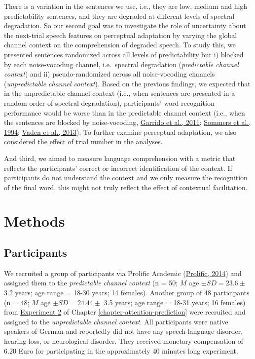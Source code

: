 \documentclass[a4paper, nobind]{templates/ociamthesis}
\begin{document}
There is a variation in the sentences we use, i.e., they are low, medium and high predictability sentences, and they are degraded at different levels of spectral degradation.
So our second goal was to investigate the role of uncertainty about the next-trial speech features on perceptual adaptation by varying the global channel context on the comprehension of degraded speech.
To study this, we presented sentences randomized across all levels of predictability but
i) blocked by each noise-vocoding channel, i.e.~spectral degradation (\emph{predictable channel context}) and
ii) pseudo-randomized across all noise-vocoding channels (\emph{unpredictable channel context}).
Based on the previous findings, we expected that in the unpredictable channel context (i.e., when sentences are presented in a random order of spectral degradation), participants' word recognition performance would be worse than in the predictable channel context (i.e., when the sentences are blocked by noise-vocoding, \protect\hyperlink{ref-Garrido2011}{Garrido et al., 2011}; \protect\hyperlink{ref-Sommers1994}{Sommers et al., 1994}; \protect\hyperlink{ref-Vaden2013}{Vaden et al., 2013}).
To further examine perceptual adaptation, we also considered the effect of trial number in the analyses.

And third, we aimed to measure language comprehension with a metric that reflects the participants' correct or incorrect identification of the context.
If participants do not understand the context and we only measure the recognition of the final word, this might not truly reflect the effect of contextual facilitation.

\hypertarget{methods-2}{%
\section{Methods}\label{methods-2}}

\hypertarget{participants-1}{%
\subsection{Participants}\label{participants-1}}

We recruited a group of participants via Prolific Academic (\protect\hyperlink{ref-Prolific}{Prolific, 2014}) and assigned them to the \emph{predictable channel context} (n = 50; \(M\) age \(\pm SD=23.6\pm\) 3.2 years; age range = 18-30 years; 14 females).
Another group of 48 participants (n = 48; \(M\) age \(\pm SD=24.44\pm\) 3.5 years; age range = 18-31 years; 16 females) from \protect\hyperlink{experiment1b}{Experiment 2} of Chapter \ref{chapter-attention-prediction} were recruited and assigned to the \emph{unpredictable channel context}.
All participants were native speakers of German and reportedly did not have any speech-language disorder, hearing loss, or neurological disorder.
They received monetary compensation of 6.20 Euro for participating in the approximately 40 minutes long experiment.
\end{document}
